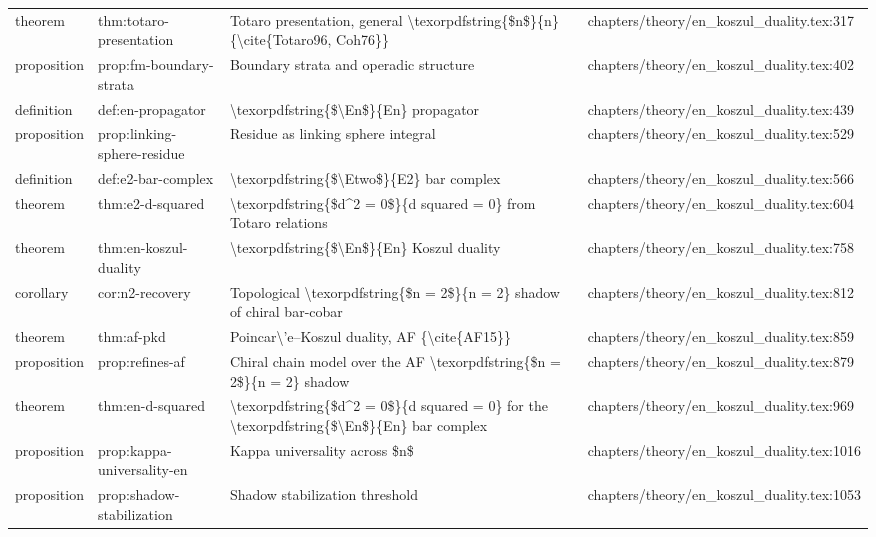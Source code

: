 \documentclass[11pt]{article}
\begin{document}
\begin{longtable}{L{0.10\textwidth}L{0.26\textwidth}L{0.42\textwidth}L{0.22\textwidth}}
theorem & thm:totaro-presentation & Totaro presentation, general \textbackslash{}texorpdfstring\{\$n\$\}\{n\} \{\textbackslash{}cite\{Totaro96, Coh76\}\} & chapters/theory/en\_koszul\_duality.tex:317\\
proposition & prop:fm-boundary-strata & Boundary strata and operadic structure & chapters/theory/en\_koszul\_duality.tex:402\\
definition & def:en-propagator & \textbackslash{}texorpdfstring\{\$\textbackslash{}En\$\}\{En\} propagator & chapters/theory/en\_koszul\_duality.tex:439\\
proposition & prop:linking-sphere-residue & Residue as linking sphere integral & chapters/theory/en\_koszul\_duality.tex:529\\
definition & def:e2-bar-complex & \textbackslash{}texorpdfstring\{\$\textbackslash{}Etwo\$\}\{E2\} bar complex & chapters/theory/en\_koszul\_duality.tex:566\\
theorem & thm:e2-d-squared & \textbackslash{}texorpdfstring\{\$d\textasciicircum{}2 = 0\$\}\{d squared = 0\} from Totaro relations & chapters/theory/en\_koszul\_duality.tex:604\\
theorem & thm:en-koszul-duality & \textbackslash{}texorpdfstring\{\$\textbackslash{}En\$\}\{En\} Koszul duality & chapters/theory/en\_koszul\_duality.tex:758\\
corollary & cor:n2-recovery & Topological \textbackslash{}texorpdfstring\{\$n = 2\$\}\{n = 2\} shadow of chiral bar-cobar & chapters/theory/en\_koszul\_duality.tex:812\\
theorem & thm:af-pkd & Poincar\textbackslash{}'e--Koszul duality, AF \{\textbackslash{}cite\{AF15\}\} & chapters/theory/en\_koszul\_duality.tex:859\\
proposition & prop:refines-af & Chiral chain model over the AF \textbackslash{}texorpdfstring\{\$n = 2\$\}\{n = 2\} shadow & chapters/theory/en\_koszul\_duality.tex:879\\
theorem & thm:en-d-squared & \textbackslash{}texorpdfstring\{\$d\textasciicircum{}2 = 0\$\}\{d squared = 0\} for the \textbackslash{}texorpdfstring\{\$\textbackslash{}En\$\}\{En\} bar complex & chapters/theory/en\_koszul\_duality.tex:969\\
proposition & prop:kappa-universality-en & Kappa universality across \$n\$ & chapters/theory/en\_koszul\_duality.tex:1016\\
proposition & prop:shadow-stabilization & Shadow stabilization threshold & chapters/theory/en\_koszul\_duality.tex:1053\\

\end{longtable}
\end{document}
